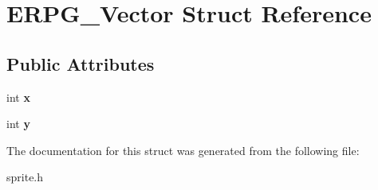 \hypertarget{structERPG__Vector}{\section{E\-R\-P\-G\-\_\-\-Vector Struct Reference}
\label{structERPG__Vector}
}
\subsection*{Public Attributes}
\begin{DoxyCompactItemize}
\item 
\hypertarget{structERPG__Vector_ac2c94253c34e01327daab8f0c7aa4f11}{int {\bfseries x}}\label{structERPG__Vector_ac2c94253c34e01327daab8f0c7aa4f11}

\item 
\hypertarget{structERPG__Vector_a68939119b2d9bc6264062aa848011694}{int {\bfseries y}}\label{structERPG__Vector_a68939119b2d9bc6264062aa848011694}

\end{DoxyCompactItemize}


The documentation for this struct was generated from the following file\-:\begin{DoxyCompactItemize}
\item 
sprite.\-h\end{DoxyCompactItemize}
